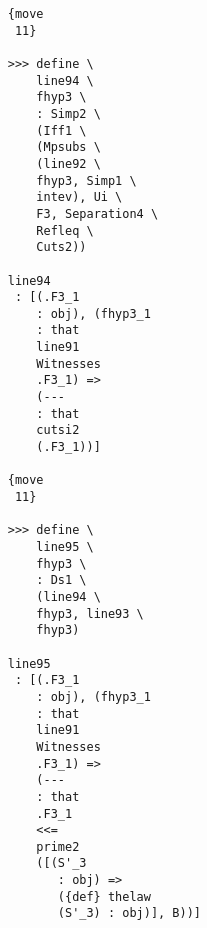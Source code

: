 \documentclass[12pt]{article}
\begin{document}
\begin{verbatim}
                                    {move 
                                     11}

                                    >>> define \
                                        line94 \
                                        fhyp3 \
                                        : Simp2 \
                                        (Iff1 \
                                        (Mpsubs \
                                        (line92 \
                                        fhyp3, Simp1 \
                                        intev), Ui \
                                        F3, Separation4 \
                                        Refleq \
                                        Cuts2))

                                    line94 
                                     : [(.F3_1 
                                        : obj), (fhyp3_1 
                                        : that 
                                        line91 
                                        Witnesses 
                                        .F3_1) => 
                                        (--- 
                                        : that 
                                        cutsi2 
                                        (.F3_1))]

                                    {move 
                                     11}

                                    >>> define \
                                        line95 \
                                        fhyp3 \
                                        : Ds1 \
                                        (line94 \
                                        fhyp3, line93 \
                                        fhyp3)

                                    line95 
                                     : [(.F3_1 
                                        : obj), (fhyp3_1 
                                        : that 
                                        line91 
                                        Witnesses 
                                        .F3_1) => 
                                        (--- 
                                        : that 
                                        .F3_1 
                                        <<= 
                                        prime2 
                                        ([(S'_3 
                                           : obj) => 
                                           ({def} thelaw 
                                           (S'_3) : obj)], B))]


\end{verbatim}
\end{document}
